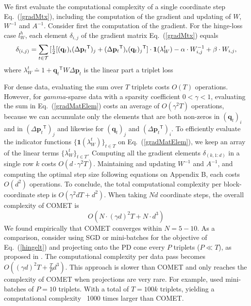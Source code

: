 \documentclass[twoside,11pt]{article}
\newcommand\mat[1]{{#1}}
\renewcommand\vec[1]{\mathbf{#1}}
\newcommand{\T}{{}^\mathsf{T}}
\newcommand{\W}{\mat{W}}
\newcommand{\eqdef}{\doteq}
\newcommand{\q}{{\vec{q}}}
\newcommand{\p}{{\vec{p}}}
\newcommand{\trip}{{t}}
\newcommand{\qt}{{\q_{\trip}}}
\newcommand{\invA}{A^{-1}}
\renewcommand{\eqref}[1]{Eq.~(\ref{#1})}
\begin{document}
We first evaluate the computational complexity of a single coordinate step \eqref{gradMtx}, including the computation of the gradient and updating of $\W$, $\W^{-1}$ and $\invA$. Consider first the computation of the gradient. For the hinge-loss case $l^{h}_W$, each element $\delta_{i,j}$ of the gradient matrix \eqref{gradMtx} equals
\begin{equation}
    \delta_{(i,j)} = \sum\limits_{t\in \cal{T}}{ [\tfrac{1}{2}[(\vec{q}_{t})_i(\Delta\vec{p}_{t}\T)_j + (\Delta\vec{p}_{t}\T)_i(\vec{q}_{t})_j\T] } \cdot \textbf{1}(\lambda_{W}^t) - \alpha \cdot \W^{-1}_{i,j} + \beta \cdot \W_{i,j},
\label{gradMatElem}
\end{equation}
where $\lambda_{W}^t \eqdef 1+\qt\T \W \Delta\p_{t}$ is the linear part a triplet loss

For dense data, evaluating the sum over $T$ triplets costs $O(T)$ operations. However, for $gamma$-sparse data with a sparsity coefficient $ 0< \gamma <1 $, evaluating the sum in \eqref{gradMatElem} costs an average of $O(\gamma^2 T)$ operations, because we can accumulate only the elements that are both non-zeros in $(\vec{q}_{t})_i$ and in $(\Delta\vec{p}_{t}\T)_j  $ and likewise for $(\vec{q}_{t})_j$ and $(\Delta\vec{p}_{t}\T)_i$.   To efficiently evaluate the indicator functions $\{ \textbf{1}(\lambda_{W}^t) \}_{t \in T}$ on \eqref{gradMatElem}, we keep an array of the linear terms $\{\lambda_{W}^t\}_{t \in T}$. Computing all the gradient elements $\delta_{(k,1:d)}$ in a single row $k$ costs $O(d\cdot \gamma^2 T)$.
Maintaining and updating $\W^{-1}$ and $\invA$, and computing the optimal step size following equations on Appendix B, each costs $O(d^2)$ operations. 
To conclude, the total computational complexity per block-coordinate step is $O(\gamma^2 d T + d^2)$. When taking $Nd$ coordinate steps, the overall complexity of COMET is 
\begin{equation}
O(N \cdot (\gamma d)^2 T + N \cdot d^3)
\label{cometComplexity}
\end{equation}
We found empirically that COMET converges within $N= 5 - 10$. As a comparison, consider using SGD or mini-batches for the objective of \eqref{hingelt} and projecting onto the PD cone every $P$ triplets ($P \ll T$), as proposed in \citep{OASIS,qian}. The computational complexity per data pass becomes $O((\gamma d)^2 T + \frac{T}{P} d^3)$. This approach is slower than COMET and only reaches the complexity of COMET when projections are very rare. For example, \citet{qian} used mini-batches of $P=10$ triplets. With a total of $T=100k$ triplets, yielding a computational complexity ~1000 times larger than COMET.
\end{document}
